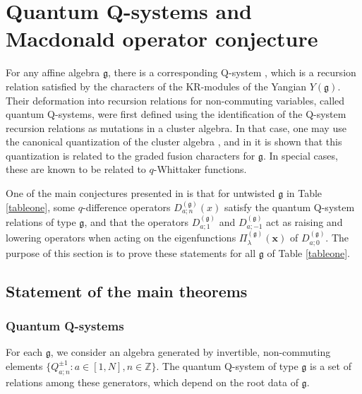 \documentclass[12pt]{amsart}
\newcommand{\g}{{\mathfrak{g}}}
\newcommand{\Z}{{\mathbb Z}}
\newcommand{\bx}{{\mathbf x}}
\numberwithin{equation}{section}
\begin{document}
%
%
%
%
%
%
%
%
%
%
%
%
%
%
%
%
%
%
%
%
%
%
%
%
%
%
%
%
%
%
%
%
%
%
%
%
%
%
%
%
%
%
%
%
%
%
%
%
%
%
%
%
%






%

\section{Quantum Q-systems and Macdonald operator conjecture}
\label{sec:proof}


For any affine algebra $\g$, there is a corresponding Q-system \cite{HKOTY,HKOTT}, which is a recursion relation satisfied by the characters of the KR-modules \cite{ChariMoura} of the Yangian $Y(\g)$. Their deformation into recursion relations for non-commuting variables, called quantum Q-systems, were first defined \cite{krKR} using the identification of the Q-system recursion relations as mutations in a cluster algebra. In that case, one may use the canonical quantization of the cluster algebra \cite{BZ}, and in \cite{krKR,Simon,SimonTwisted} it is shown that this quantization is related to the graded fusion characters for $\g$. In special cases, these are known to be related to $q$-Whittaker functions.

One of the main conjectures presented in \cite{DFKconj} is that for untwisted $\g$ in Table \ref{tableone}, 
some $q$-difference operators
$D_{a;n}^{(\g)}(x)$ satisfy
the quantum Q-system relations of type $\g$, and
that the operators 
$D_{a;1}^{(\g)}$ and $D_{a;-1}^{(\g)}$ act as raising and lowering operators when acting 
on the eigenfunctions $\Pi_\lambda^{(\g)}(\bx)$ of $D_{a;0}^{(\g)}$. The purpose of this section is to prove these statements for all $\g$ of Table \ref{tableone}.







\subsection{Statement of the main theorems}\label{sec:41}



\subsubsection{Quantum Q-systems}\label{QsysSec}
For each $\g$, we consider an algebra generated by invertible, non-commuting elements $\{Q_{a;n}^{\pm1}: a\in[1,N], n\in\Z\}$. The quantum Q-system of type $\g$ is a set of relations among these generators, which depend on the root data of $\g$. 
\end{document}
